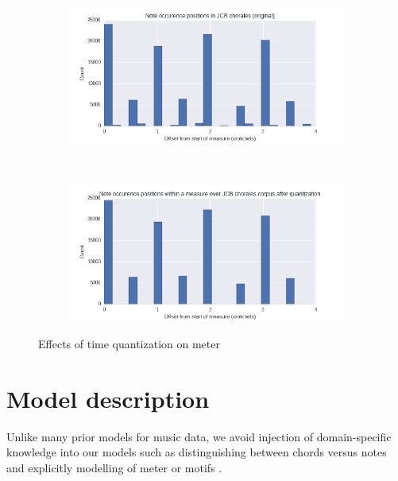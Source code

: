 \documentclass[dissertation.tex]{subfiles}
\begin{document}
\begin{figure}[htpb]
    \centering
    \begin{subfigure}[t]{0.48\textwidth}
        \centering
        \includegraphics[width=1.0\linewidth]{Figures/meter-usage-original.png}
    \end{subfigure}
    ~
    \begin{subfigure}[t]{0.48\textwidth}
        \centering
        \includegraphics[width=1.0\linewidth]{Figures/meter-usage-quantized.png}
    \end{subfigure}
    \caption{Effects of time quantization on meter}
    \label{fig:meter-time-quantization}
\end{figure}



\section{Model description}

Unlike many prior models for music data, we avoid injection of
domain-specific knowledge into our models such as distinguishing between chords
versus notes \cite{hild1991harmonet}\cite{mozer1994neural} \cite{Eck2002} and
explicitly modelling of meter \cite{eck2008learning} or motifs
\cite{feulner1994melot}.
\end{document}
